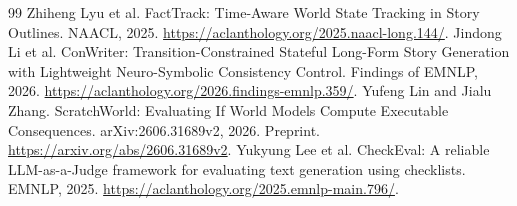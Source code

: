 \begin{thebibliography}{99}
 Zhiheng Lyu et al. FactTrack: Time-Aware World State
Tracking in Story Outlines. NAACL, 2025.
\url{https://aclanthology.org/2025.naacl-long.144/}.
 Jindong Li et al. ConWriter: Transition-Constrained Stateful
Long-Form Story Generation with Lightweight Neuro-Symbolic Consistency Control.
Findings of EMNLP, 2026.
\url{https://aclanthology.org/2026.findings-emnlp.359/}.
 Yufeng Lin and Jialu Zhang. ScratchWorld: Evaluating If
World Models Compute Executable Consequences. arXiv:2606.31689v2, 2026.
Preprint. \url{https://arxiv.org/abs/2606.31689v2}.
 Yukyung Lee et al. CheckEval: A reliable LLM-as-a-Judge
framework for evaluating text generation using checklists. EMNLP, 2025.
\url{https://aclanthology.org/2025.emnlp-main.796/}.
\end{thebibliography}
